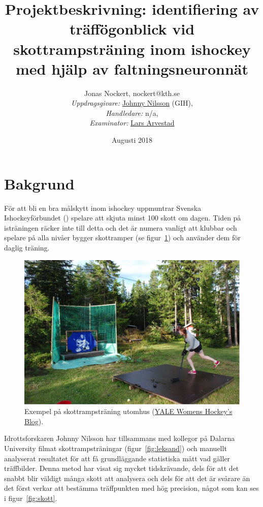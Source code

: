\documentclass[a4paper,12pt]{article}
\title{Projektbeskrivning: identifiering av träffögonblick vid
  skottrampsträning inom ishockey med hjälp av faltningsneuronnät}
\author{Jonas Nockert, nockert@kth.se
  \\[0.5cm]
    \small \textit{Uppdragsgivare:}
    \href{http://www.gih.se/Personal/Johnny-Nilsson/} {Johnny Nilsson} (GIH),\\
    \small \textit{Handledare:}
    n/a,\\
    \small \textit{Examinator:}
    \href{http://staff.math.su.se/arve/} {Lars Arvestad}
}
\date{\small Augusti 2018}
\begin{document}
\maketitle

\section*{Bakgrund}
För att bli en bra målskytt inom ishockey uppmuntrar Svenska Ishockeyförbundet
(\citeyear{Swehockey:2016}) spelare att skjuta minst 100 skott om dagen. Tiden
på isträningen räcker inte till detta och det är numera vanligt att klubbar
och spelare på alla nivåer bygger skottramper (se figur~\ref{fig:skottramp})
och använder dem för daglig träning.

\begin{figure}[ht]
  \centering
  \includegraphics[width=\linewidth]{photos/the-incredible-shooting-ramp-my-mom-built-for-me.png}
  \caption{Exempel på skottrampsträning utomhus
  (\href{https://yalewomenshockey.wordpress.com/2013/07/18/ywih-summer-blog-hanna-astrom/}{YALE Womens Hockey's Blog}).
  \label{fig:skottramp}}
\end{figure}

Idrottsforskaren Johnny Nilsson har tillsammans med kollegor på Dalarna
University filmat skottrampsträningar (figur~\ref{fig:leksand}) och manuellt
analyserat resultatet för att få grundläggande statistiska mått vad gäller
träffbilder. Denna metod har visat sig mycket tidskrävande, dels för att
det snabbt blir väldigt många skott att analysera och dels för att det är
svårare än det först verkar att bestämma träffpunkten med hög precision, något
som kan ses i figur~\ref{fig:skott}.
\end{document}
